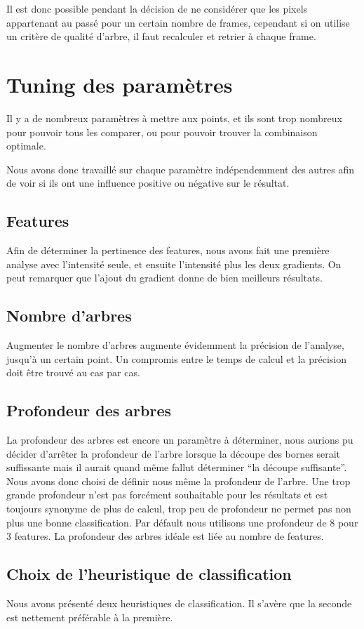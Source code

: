 \documentclass[11pt,a4paper]{report}
\begin{document}
			Il est donc possible pendant la décision de ne considérer que les pixels appartenant au passé pour un certain nombre de 
			frames, cependant si on utilise un critère de qualité d'arbre, il faut recalculer et retrier à chaque frame.

\section{Tuning des paramètres}
	Il y a de nombreux paramètres à mettre aux points, et ils sont trop nombreux pour pouvoir tous les comparer, ou pour pouvoir trouver la combinaison optimale.
	
	Nous avons donc travaillé sur chaque paramètre indépendemment des autres afin de voir si ils ont une influence positive ou négative sur le résultat. 
	\subsection{Features}
		Afin de déterminer la pertinence des features, nous avons fait une première analyse avec l'intensité seule, et ensuite l'intensité 
		plus les deux gradients.
		On peut remarquer que l'ajout du gradient donne de bien meilleurs résultats.
	\subsection{Nombre d'arbres}
	Augmenter le nombre d'arbres augmente évidemment la précision de l'analyse, jusqu'à un certain point. Un compromis entre le temps de calcul et la
	précision doit être trouvé au cas par cas. 

	\subsection{Profondeur des arbres}
	La profondeur des arbres est encore un paramètre à déterminer, nous aurions pu décider d'arrêter la profondeur de l'arbre lorsque la découpe 
	des bornes serait suffissante mais il aurait quand même fallut déterminer ``la découpe suffisante''. Nous avons donc choisi de 
	définir nous même la profondeur de l'arbre. Une trop grande profondeur n'est pas forcément souhaitable pour les résultats et 
	est toujours synonyme de plus de calcul, trop peu de profondeur ne permet pas non plus une bonne classification. 
	Par défault nous utilisons une profondeur de 8 pour 3 features. La profondeur des arbres idéale est liée au nombre de features.

	\subsection{Choix de l'heuristique de classification}
	Nous avons présenté deux heuristiques de classification. Il s'avère que la seconde est nettement préférable à la première. 
\end{document}
